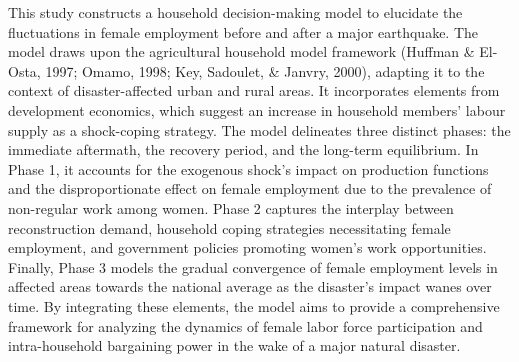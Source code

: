 \documentclass[a4paper,12pt]{article}
\begin{document}
This study constructs a household decision-making model to elucidate the fluctuations in female employment before and after a major earthquake. The model draws upon the agricultural household model framework (Huffman \& El-Osta, 1997; Omamo, 1998; Key, Sadoulet, \& Janvry, 2000), adapting it to the context of disaster-affected urban and rural areas. It incorporates elements from development economics, which suggest an increase in household members' labour supply as a shock-coping strategy.
The model delineates three distinct phases: the immediate aftermath, the recovery period, and the long-term equilibrium. In Phase 1, it accounts for the exogenous shock's impact on production functions and the disproportionate effect on female employment due to the prevalence of non-regular work among women. Phase 2 captures the interplay between reconstruction demand, household coping strategies necessitating female employment, and government policies promoting women's work opportunities. Finally, Phase 3 models the gradual convergence of female employment levels in affected areas towards the national average as the disaster's impact wanes over time.
By integrating these elements, the model aims to provide a comprehensive framework for analyzing the dynamics of female labor force participation and intra-household bargaining power in the wake of a major natural disaster.



\nocite{*}

\end{document}
